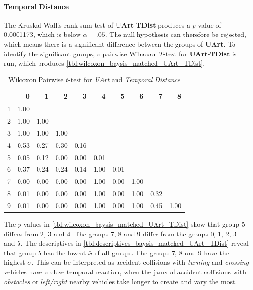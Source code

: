 \paragraph{Temporal Distance}
The Kruskal-Wallis rank sum test of \textbf{UArt}-\textbf{TDist} produces a $p$-value of 0.0001173, which is below $\alpha=.05$. The null hypothesis can therefore be rejected, which means there is a significant difference between the groups of \textbf{UArt}. To identify the significant groups, a pairwise Wilcoxon $T$-test for \textbf{UArt}-\textbf{TDist} is run, which produces \autoref{tbl:wilcoxon_baysis_matched_UArt_TDist}. 
\begin{table}[ht]
	\small
	\centering
	\begin{tabular}{rrrrrrrrrr}
  		\toprule
		& 0 & 1 & 2 & 3 & 4 & 5 & 6 & 7 & 8 \\ 
		\midrule
		1 & 1.00 &  &  &  &  &  &  &  &  \\ 
		2 & 1.00 & 1.00 &  &  &  &  &  &  &  \\ 
		3 & 1.00 & 1.00 & 1.00 &  &  &  &  &  &  \\ 
		4 & 0.53 & 0.27 & 0.30 & 0.16 &  &  &  &  &  \\ 
		5 & 0.05 & 0.12 & 0.00 & 0.00 & 0.01 &  &  &  &  \\ 
		6 & 0.37 & 0.24 & 0.24 & 0.14 & 1.00 & 0.01 &  &  &  \\ 
		7 & 0.00 & 0.00 & 0.00 & 0.00 & 1.00 & 0.00 & 1.00 &  &  \\ 
		8 & 0.01 & 0.00 & 0.00 & 0.00 & 1.00 & 0.00 & 1.00 & 0.32 &  \\ 
		9 & 0.01 & 0.00 & 0.00 & 0.00 & 1.00 & 0.00 & 1.00 & 0.45 & 1.00 \\ 
		\bottomrule
	\end{tabular}
	\caption{Wilcoxon Pairwise $t$-test for \textit{UArt} and \textit{Temporal Distance}}
	\label{tbl:wilcoxon_baysis_matched_UArt_TDist}
\end{table}
The $p$-values in \autoref{tbl:wilcoxon_baysis_matched_UArt_TDist} show that group 5 differs from 2, 3 and 4. The groups 7, 8 and 9 differ from the groups 0, 1, 2, 3 and 5. The descriptives in \autoref{tbl:descriptives_baysis_matched_UArt_TDist} reveal that group 5 has the lowest $\bar{x}$ of all groups. The groups 7, 8 and 9 have the highest $\sigma$. This can be interpreted as accident collisions with \textit{turning} and \textit{crossing} vehicles have a close temporal reaction, when the jams of accident collisions with \textit{obstacles} or \textit{left/right} nearby vehicles take longer to create and vary the most.
